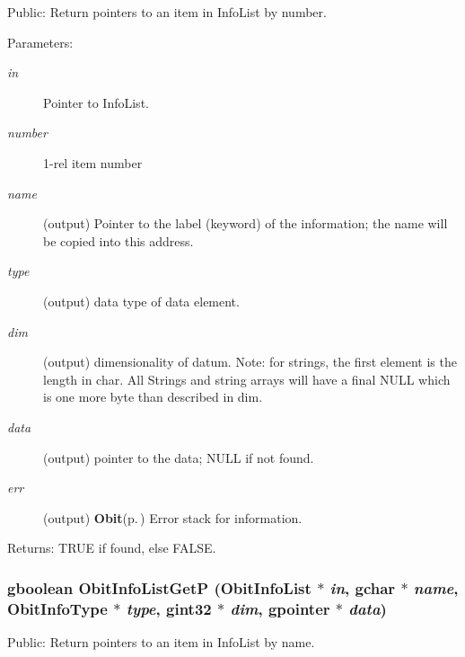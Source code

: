 Public: Return pointers to an item in Info\-List by number. 

\begin{Desc}
\item[Parameters:]
\begin{description}
\item[{\em in}]Pointer to Info\-List. \item[{\em number}]1-rel item number \item[{\em name}](output) Pointer to the label (keyword) of the information; the name will be copied into this address. \item[{\em type}](output) data type of data element. \item[{\em dim}](output) dimensionality of datum. Note: for strings, the first element is the length in char. All Strings and string arrays will have a final NULL which is one more byte than described in dim. \item[{\em data}](output) pointer to the data; NULL if not found. \item[{\em err}](output) {\bf Obit}{\rm (p.\,\pageref{structObit})} Error stack for information. \end{description}
\end{Desc}
\begin{Desc}
\item[Returns:]TRUE if found, else FALSE. \end{Desc}
\subsubsection{\setlength{\rightskip}{0pt plus 5cm}gboolean Obit\-Info\-List\-Get\-P ({\bf Obit\-Info\-List} $\ast$ {\em in}, gchar $\ast$ {\em name}, Obit\-Info\-Type $\ast$ {\em type}, gint32 $\ast$ {\em dim}, gpointer $\ast$ {\em data})}\label{ObitInfoList_8h_a14}


Public: Return pointers to an item in Info\-List by name. 

